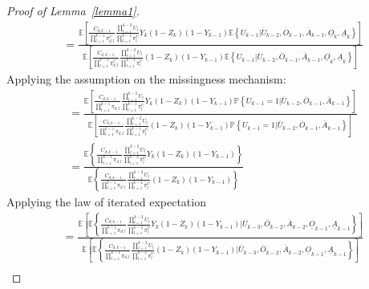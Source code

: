 \documentclass[12pt]{article}
\begin{document}
\begin{proof}[Proof of Lemma~\ref{lemma1}]
\begin{align*}
&= \frac{\mathbb{E} \left[ \frac{C_{d,k-1}}{\prod_{l=1}^{k-1}  \pi^C_{d,l}} \frac{ \prod_{l=1}^{k-2} U_{l}}{\prod_{l=1}^{k-1}  \pi^U_{l}} Y_{k} \left(1-Z_{k} \right) \left(1-Y_{k-1} \right) \mathbb{E} \left\lbrace U_{k-1} \vert \overline{U}_{k-2}, \overline{O}_{k-1}, \overline{A}_{k-1}, \underline{O}_{k}, \underline{A}_{k} \right\rbrace \right]}{\mathbb{E} \left[  \frac{C_{d,k-1}}{\prod_{l=1}^{k-1}  \pi^C_{d,l}} \frac{ \prod_{l=1}^{k-2} U_{l}}{\prod_{l=1}^{k-1}  \pi^U_{l}} \left(1-Z_{k} \right) \left(1-Y_{k-1} \right) \mathbb{E} \left\lbrace U_{k-1} \vert  \overline{U}_{k-2}, \overline{O}_{k-1}, \overline{A}_{k-1}, \underline{O}_{k}, \underline{A}_{k} \right\rbrace \right]} 
\end{align*}
Applying the assumption on the missingness mechanism:
\begin{align*}
&= \frac{\mathbb{E} \left[ \frac{C_{d,k-1}}{\prod_{l=1}^{k-1}  \pi_{d,l}} \frac{ \prod_{l=1}^{k-2} U_{l}}{\prod_{l=1}^{k-1}  \pi^U_{l}} Y_{k} \left(1-Z_{k} \right) \left(1-Y_{k-1} \right) \mathbb{P} \left\lbrace U_{k-1} = 1 \vert \overline{U}_{k-2}, \overline{O}_{k-1}, \overline{A}_{k-1} \right\rbrace \right]}{\mathbb{E} \left[  \frac{C_{d,k-1}}{\prod_{l=1}^{k-1}  \pi_{d,l}} \frac{ \prod_{l=1}^{k-2} U_{l}}{\prod_{l=1}^{k-1}  \pi^U_{l}} \left(1-Z_{k} \right) \left(1-Y_{k-1} \right) \mathbb{P} \left\lbrace U_{k-1} = 1 \vert  \overline{U}_{k-2}, \overline{O}_{k-1}, \overline{A}_{k-1} \right\rbrace \right]} \\
&= \frac{\mathbb{E} \left\lbrace \frac{C_{d,k-1}}{\prod_{l=1}^{k-1}  \pi_{d,l}} \frac{ \prod_{l=1}^{k-2} U_{l}}{\prod_{l=1}^{k-2}  \pi^U_{l}} Y_{k} \left(1-Z_{k} \right) \left(1-Y_{k-1} \right) \right\rbrace}{\mathbb{E} \left\lbrace  \frac{C_{d,k-1}}{\prod_{l=1}^{k-1}  \pi_{d,l}} \frac{ \prod_{l=1}^{k-2} U_{l}}{\prod_{l=1}^{k-2}  \pi^U_{l}} \left(1-Z_{k} \right) \left(1-Y_{k-1} \right) \right\rbrace} 
\end{align*}
Applying the law of iterated expectation
\begin{align*}
&= \frac{\mathbb{E} \left[ \mathbb{E} \left\lbrace \frac{C_{d,k-1}}{\prod_{l=1}^{k-1} \pi_{d,l}} \frac{ \prod_{l=1}^{k-2} U_{l}}{\prod_{l=1}^{k-2}  \pi^U_{l}} Y_{k} \left(1-Z_{k} \right) \left(1-Y_{k-1} \right) \vert \overline{U}_{k-3}, \overline{O}_{k-2}, \overline{A}_{k-2}, \underline{O}_{k-1}, \underline{A}_{k-1} \right\rbrace \right]}{\mathbb{E} \left[ \mathbb{E} \left\lbrace \frac{C_{d,k-1}}{\prod_{l=1}^{k-1}  \pi_{d,l}} \frac{ \prod_{l=1}^{k-2} U_{l}}{\prod_{l=1}^{k-2}  \pi^U_{l}} \left(1-Z_{k} \right) \left(1-Y_{k-1} \right) \vert  \overline{U}_{k-3}, \overline{O}_{k-2}, \overline{A}_{k-2}, \underline{O}_{k-1}, \underline{A}_{k-1} \right\rbrace \right]} \\

\end{align*}
\end{proof}
\end{document}
